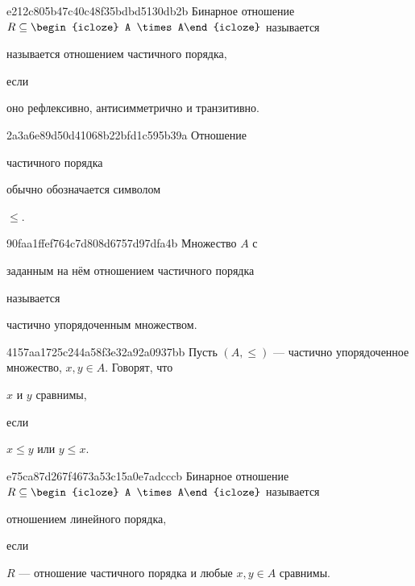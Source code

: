 \begin{note}{e212c805b47c40c48f35bdbd5130db2b}
    Бинарное отношение \({ R \subseteq \begin{icloze}{3}A \times A\end{icloze} }\) называется \begin{icloze}{2}называется отношением частичного порядка,\end{icloze} если \begin{icloze}{1}оно рефлексивно, антисимметрично и транзитивно.\end{icloze}
\end{note}

\begin{note}{2a3a6e89d50d41068b22bfd1c595b39a}
    Отношение \begin{icloze}{2}частичного порядка\end{icloze} обычно обозначается символом \begin{icloze}{1}\({ \leqslant }\).\end{icloze}
\end{note}

\begin{note}{90faa1ffef764c7d808d6757d97dfa4b}
    Множество \({ A }\) с \begin{icloze}{2}заданным на нём отношением частичного порядка\end{icloze} называется \begin{icloze}{1}частично упорядоченным множеством.\end{icloze}
\end{note}

\begin{note}{4157aa1725c244a58f3e32a92a0937bb}
    Пусть \({ (A, \leqslant) }\) --- частично упорядоченное множество, \({ x, y \in A }\).
    Говорят, что \begin{icloze}{2}\({ x }\) и \({ y }\) сравнимы,\end{icloze} если \begin{icloze}{1}\({ x \leqslant y }\) или \({ y \leqslant x }\).\end{icloze}
\end{note}

\begin{note}{e75ca87d267f4673a53c15a0e7adcccb}
    Бинарное отношение \({ R \subseteq \begin{icloze}{3}A \times A\end{icloze} }\) называется \begin{icloze}{2}отношением линейного порядка,\end{icloze} если \begin{icloze}{1}\({ R }\) --- отношение частичного порядка и любые \({ x, y \in A }\) сравнимы.\end{icloze}
\end{note}

